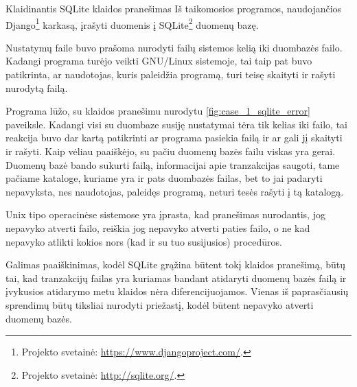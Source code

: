 \begin{xcase}{Klaidinantis SQLite klaidos pranešimas}
  \xcgoal
  {
    Iš taikomosios programos, naudojančios 
    Django\footnote{Projekto svetainė: \url{https://www.djangoproject.com/}.} 
    karkasą, įrašyti duomenis į
    SQLite\footnote{Projekto svetainė: \url{http://sqlite.org/}.}
    duomenų bazę.
  }
  
  \xctools
  {
    Nustatymų faile buvo prašoma nurodyti failų sistemos kelią iki duombazės 
    failo. Kadangi programa turėjo veikti GNU/Linux sistemoje, tai taip
    pat buvo patikrinta, ar naudotojas, kuris paleidžia programą, turi
    teisę skaityti ir rašyti nurodytą failą.
  }
  
  \xcresult
  {
    Programa lūžo, su klaidos pranešimu nurodytu
    \ref{fig:case_1_sqlite_error} paveiksle. Kadangi visi su duombaze susiję
    nustatymai tėra tik kelias iki failo, tai reakcija buvo dar kartą
    patikrinti ar programa pasiekia failą ir ar gali jį skaityti ir rašyti.
    Kaip vėliau paaiškėjo, su pačiu duomenų bazės failu viskas yra gerai.
    Duomenų bazė bando sukurti failą, informacijai apie tranzakcijas
    saugoti, tame pačiame kataloge, kuriame yra ir pats duombazės failas,
    bet to jai padaryti nepavyksta, nes naudotojas, paleidęs programą,
    neturi tesės rašyti į tą katalogą.
    
  }
  
  \xcprinciples
  {
    {
      Unix tipo operacinėse
      sistemose yra įprasta, kad pranešimas nurodantis, jog nepavyko
      atverti failo, reiškia jog nepavyko atverti paties failo, o ne
      kad nepavyko atlikti kokios nors (kad ir su tuo susijusios)
      procedūros.
    }
  }
  
  \xcthoughts
  {
    Galimas paaiškinimas, kodėl SQLite grąžina būtent tokį klaidos
    pranešimą, būtų tai, kad tranzakcijų failas yra kuriamas bandant
    atidaryti duomenų bazės failą ir įvykusios atidarymo metu klaidos
    nėra diferencijuojamos. Vienas iš paprasčiausių sprendimų būtų
    tiksliai nurodyti priežastį, kodėl būtent nepavyko atverti
    duomenų bazės.
  }
\end{xcase}
